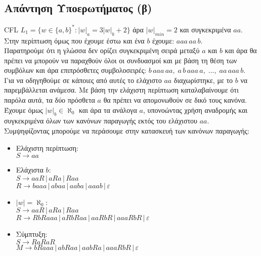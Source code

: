 \subsection{Απάντηση Υποερωτήματος (β)}
\label{ssec:Solution_1.2}
\doublespacing

CFL
$ L_1 = \{w \in \{a, b\}^* : |w|_a = 3|w|_b + 2 \}$
άρα $\vert w \vert_{min} = 2$ και συγκεκριμένα $aa$.\\
Στην περίπτωση όμως που έχουμε έστω και ένα $b$ έχουμε:
$aaa\,aa\,b$.\\
Παρατηρούμε ότι η γλώσσα δεν ορίζει συγκεκριμένη σειρά μεταξύ $a$ και
$b$ και άρα θα πρέπει να μπορούν να παραχθούν όλοι οι συνδυασμοί και με βάση τη θέση των συμβόλων και άρα
επιπρόσθετες συμβολοσειρές: $b\,aaa\,aa,\; a\,b\,aaa\,a,\;...,\;
aa\,aaa\,b$.\\
\clearpage
Για να οδηγηθούμε σε κάποιες από αυτές το ελάχιστο $aa$ διαχωρίστηκε, με το $b$ να παρεμβάλλεται ανάμεσα.
Με βάση την ελάχιστη περίπτωση καταλαβαίνουμε ότι παρόλα αυτά, τα δύο πρόσθετα $a$ θα πρέπει να απομονωθούν σε δικό
τους κανόνα.\\
Έχουμε όμως $|w|_b \in \aleph_0$ και άρα τα ανάλογα $a$, υπονοώντας χρήση αναδρομής και συγκεκριμένα όλων των
κανόνων παραγωγής εκτός του ελάχιστου $aa$.\\
Συμψηφίζοντας μπορούμε να περάσουμε στην κατασκευή των κανόνων παραγωγής:
\reducevspace\reducevspace\reducevspace\reducevspace\reducevspace\reducevspace\reducevspace
\reducevspace\reducevspace\reducevspace\reducevspace\reducevspace\reducevspace\reducevspace
\begin{itemize}
	\itemsep0em

	\item Ελάχιστη περίπτωση:\\\reducevspace
	$S \rightarrow aa$
\reducevspace\reducevspace\reducevspace\reducevspace\reducevspace\reducevspace\reducevspace
	\item Ελάχιστα $b$:\\\reducevspace
	$S \rightarrow aaR \,|\, aRa \,|\, Raa$\\\reducevspace
	$R \rightarrow baaa \,|\, abaa \,|\, aaba \,|\, aaab \,|\, \varepsilon$\\
\reducevspace\reducevspace\reducevspace\reducevspace\reducevspace\reducevspace\reducevspace
	\item $|w| = \aleph_0$:\\\reducevspace
	$S \rightarrow aaR \,|\, aRa \,|\, Raa$\\\reducevspace
	$R \rightarrow RbRaaa \,|\, aRbRaa \,|\, aaRbR \,|\, aaaRbR \,|\, \varepsilon$\\
\reducevspace\reducevspace\reducevspace\reducevspace\reducevspace\reducevspace\reducevspace
	\item Σύμπτυξη:\\\reducevspace
	$S \rightarrow RaRaR$\\\reducevspace
	$M \rightarrow bRaaa \,|\, abRaa \,|\, aabRa \,|\, aaaRbR \,|\, \varepsilon$\\
\end{itemize}

